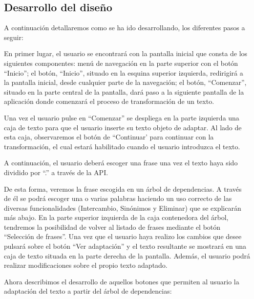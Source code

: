 \subsection{Desarrollo del diseño}

A continuación detallaremos como se ha ido desarrollando, los diferentes pasos a seguir:


	
   
	
      En primer lugar, el usuario se encontrará con la pantalla inicial que consta de los siguientes componentes: menú de navegación en la parte superior con el botón ``Inicio''; el botón, ``Inicio'', situado en la esquina superior izquierda, redirigirá a la pantalla inicial, desde cualquier parte de la navegación; el botón, ``Comenzar'', situado en la parte central de la pantalla, dará paso a la siguiente pantalla de la aplicación donde comenzará el proceso de transformación de un texto. 
	

		
		Una vez el usuario pulse en ``Comenzar'' se despliega en la parte izquierda una caja de texto para que el usuario inserte su texto objeto de adaptar. 
		Al lado de esta caja, observaremos el botón de ``Continuar' para continuar con la transformación, el cual estará habilitado cuando el usuario introduzca el texto.
	
		A continuación, el usuario deberá escoger una frase una vez el texto haya sido dividido por ``.'' a través de la API. 
		
		De esta forma, veremos la frase escogida en un árbol de dependencias. A través de él se podrá escoger una o varias palabras haciendo un uso correcto de las diversas funcionalidades (Intercambio, Sinónimos y Eliminar) que se explicarán más abajo.
		En la parte superior izquierda de la caja contenedora del árbol, tendremos la posibilidad de volver al listado de frases mediante el botón ``Selección de frases''.
		Una vez que el usuario haya realizo los cambios que desee pulsará sobre el botón ``Ver adaptación'' y el texto resultante se mostrará en una caja de texto situada en la parte derecha de la pantalla.
		Además, el usuario podrá realizar modificaciones sobre el propio texto adaptado.

	

Ahora describimos el desarrollo de aquellos botones que permiten al usuario la adaptación del texto a partir del árbol de dependencias:
	

